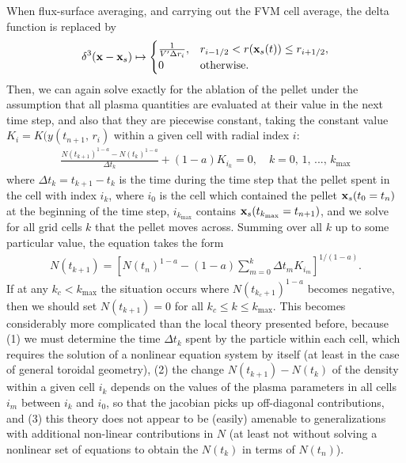 \documentclass[11pt,a4paper]{article}
\newcommand{\sub}[1]{\ensuremath{_{\text{#1}}}}
\renewcommand{\b}[1]{\ensuremath{ {\bf #1 } }}
\begin{document}
When flux-surface averaging, and carrying out the FVM cell average, the delta function is replaced by
\begin{align}
\delta^3(\b{x}-\b{x}_s) \mapsto \begin{cases}
\frac{1}{V' \Delta r_i}, & r_{i-1/2} < r(\b{x}_s(t)) \leq r_{i+1/2}, \\
0 & \text{otherwise}.
\end{cases}
\end{align}
Then, we can again solve exactly for the ablation of the pellet under the assumption that all plasma quantities are evaluated at their value in the next time step, and also that they are piecewise constant, taking the constant value $K_i = K(y(t_{n+1}, \,r_i)$ within a given cell with radial index $i$:
\begin{align}
\frac{N(t_{k+1})^{1-a} - N(t_k)^{1-a}}{\Delta t_k} + (1-a) K_{i_k} = 0, \quad k = 0,\,1,\,...,\,k\sub{max}
\end{align}
where $\Delta t_k = t_{k+1} - t_k$ is the time during the time step that the pellet spent in the cell with index $i_k$, where $i_0$ is the cell which contained the pellet $\b{x}_s(t_0 = t_n)$ at the beginning of the time step, $i_{k\sub{max}}$ contains $\b{x}_s(t_{k\sub{max}} = t_{n+1})$, and we solve for all grid cells $k$ that the pellet moves across. Summing over all $k$ up to some particular value, the equation takes the form
\begin{align}
N(t_{k+1}) = \left[ N(t_n)^{1-a} - (1-a)\sum_{m=0}^k\Delta t_m K_{i_m} \right]^{1/(1-a)}.
\end{align}
If at any $k_c<k\sub{max}$ the situation occurs where $N(t_{k_c+1})^{1-a}$ becomes negative, then we should set $N(t_{k+1})=0$ for all $k_c \leq k \leq k\sub{max}$.
This becomes considerably more complicated than the local theory presented before, because (1) we must determine the time $\Delta t_k$ spent by the particle within each cell, which requires the solution of a nonlinear equation system by itself (at least in the case of general toroidal geometry), (2) the change $N(t_{k+1}) - N(t_k)$ of the density within a given cell $i_k$ depends on the values of the plasma parameters in all cells $i_m$ between $i_k$ and $i_0$, so that the jacobian picks up off-diagonal contributions, and (3) this theory does not appear to be (easily) amenable to generalizations with additional non-linear contributions in $N$ (at least not without solving a nonlinear set of equations to obtain the $N(t_k)$ in terms of $N(t_n)$).
\end{document}
